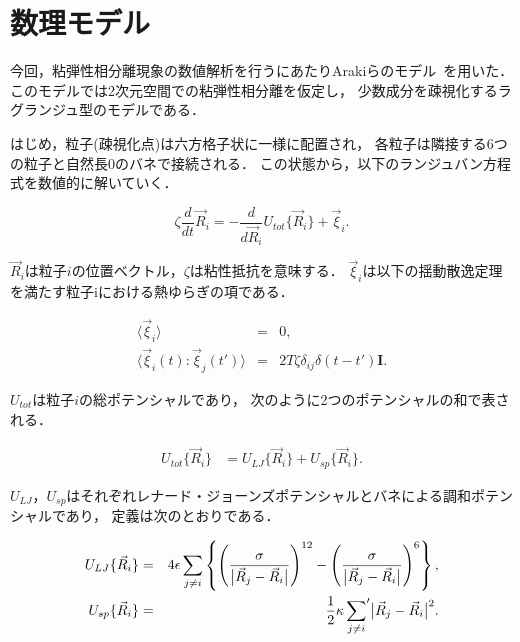 
\section{数理モデル}
今回，粘弾性相分離現象の数値解析を行うにあたりArakiらのモデル~\cite{araki2005simple}を用いた．
このモデルでは2次元空間での粘弾性相分離を仮定し，
少数成分を疎視化するラグランジュ型のモデルである．

はじめ，粒子(疎視化点)は六方格子状に一様に配置され，
各粒子は隣接する6つの粒子と自然長$0$のバネで接続される．
この状態から，以下のランジュバン方程式を数値的に解いていく．

\begin{equation}
\label{eq_main}
\zeta
\frac{d}{dt}
\vec{R}_i
=
-\frac{d}{d\vec{R}_i}
U_{tot}\{\vec{R}_i\}
+\vec{\xi}_i
.
\end{equation}

$\vec{R}_i$は粒子$i$の位置ベクトル，$\zeta$は粘性抵抗を意味する．
$\vec{\xi}_i$は以下の揺動散逸定理を満たす粒子iにおける熱ゆらぎの項である．

\begin{eqnarray}
\label{langevin0}
\langle\vec{\xi}_i\rangle &=& 0, \\
\label{langevin1}
\langle\vec{\xi}_i(t):\vec{\xi}_j(t')\rangle &=& 2T\zeta\delta_{ij}\delta(t-t')\bm{I}.
\end{eqnarray}

$U_{tot}$は粒子$i$の総ポテンシャルであり，
次のように2つのポテンシャルの和で表される．

\begin{eqnarray}
U_{tot}\{\vec{R}_i\}
&=
 U_{LJ}\{\vec{R}_i\}
+U_{sp}\{\vec{R}_i\}.
\end{eqnarray}

$U_{LJ}$，$U_{sp}$はそれぞれレナード・ジョーンズポテンシャルとバネによる調和ポテンシャルであり，
定義は次のとおりである．

\begin{eqnarray}
U_{LJ}\{\vec{R}_i\}
&=&
4\epsilon\sum_{j\neq i}
\left\{
\left(
\frac{\sigma}{\bigl|\vec{R}_j-\vec{R}_i\bigr|}
\right)^{12}
-
\left(
\frac{\sigma}{\bigl|\vec{R}_j-\vec{R}_i\bigr|}
\right)^{6}
\right\},
\\
U_{sp}\{\vec{R}_i\}
&=&
\frac{1}{2}
\kappa
\sideset{}{'}\sum_{j\neq i}
\bigl|\vec{R}_j-\vec{R}_i\bigr|^{2}.
\end{eqnarray}

